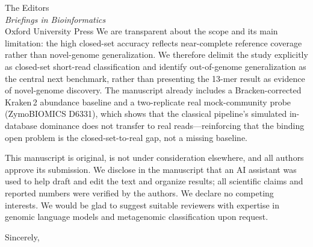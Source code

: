 \documentclass[11pt]{letter}
\begin{document}
\begin{letter}{The Editors\\ \emph{Briefings in Bioinformatics}\\ Oxford University Press}
We are transparent about the scope and its main limitation: the high closed-set
accuracy reflects near-complete reference coverage rather than novel-genome
generalization. We therefore delimit the study explicitly as closed-set
short-read classification and identify out-of-genome generalization as the
central next benchmark, rather than presenting the 13-mer result as evidence of
novel-genome discovery. The manuscript already includes a Bracken-corrected
Kraken\,2 abundance baseline and a two-replicate real mock-community probe
(ZymoBIOMICS D6331), which shows that the classical pipeline's simulated
in-database dominance does not transfer to real reads---reinforcing that the
binding open problem is the closed-set-to-real gap, not a missing baseline.

This manuscript is original, is not under consideration elsewhere, and all
authors approve its submission. We disclose in the manuscript that an AI
assistant was used to help draft and edit the text and organize results; all
scientific claims and reported numbers were verified by the authors. We declare
no competing interests. We would be glad to suggest suitable reviewers with
expertise in genomic language models and metagenomic classification upon
request.

\closing{Sincerely,}
\end{letter}
\end{document}
